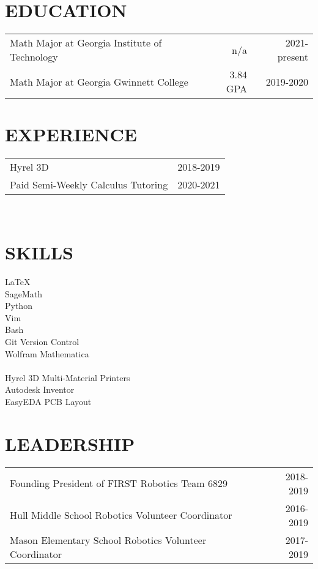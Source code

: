 \begin{resume}
\section{EDUCATION}  
\begin{tabular}{@{}lrr}
Math Major at Georgia Institute of Technology & n/a & 2021-present\\
Math Major at Georgia Gwinnett College & 3.84 GPA & 2019-2020
\end{tabular}
%
\section{EXPERIENCE}  
\begin{tabular}{@{}lr} %
    Hyrel 3D & 2018-2019\\
    Paid Semi-Weekly Calculus Tutoring & 2020-2021
\end{tabular}
\\
%
%
\section{SKILLS}  
\LaTeX\\
SageMath\\
Python\\
Vim\\
Bash\\ 
Git Version Control\\
Wolfram Mathematica\\
\\
Hyrel 3D Multi-Material Printers\\
Autodesk Inventor\\
EasyEDA PCB Layout
%
% 
%
%
\section{LEADERSHIP} 
\begin{tabular}{@{}lr}
Founding President of FIRST Robotics Team 6829 & 2018-2019\\
Hull Middle School Robotics Volunteer Coordinator & 2016-2019\\
Mason Elementary School Robotics Volunteer Coordinator & 2017-2019
\end{tabular}
%
\end{resume}
